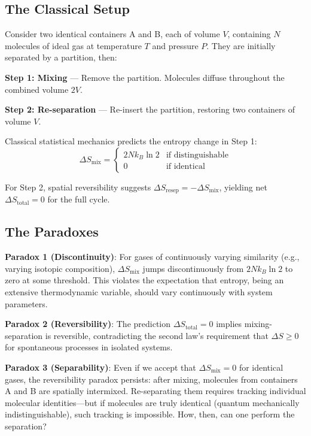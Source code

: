 \documentclass[twocolumn,superscriptaddress,prb,10pt]{revtex4-2}
\theoremstyle{definition}
\theoremstyle{remark}
\begin{document}
\subsection{The Classical Setup}

Consider two identical containers A and B, each of volume $V$, containing $N$ molecules of ideal gas at temperature $T$ and pressure $P$. They are initially separated by a partition, then:

\textbf{Step 1: Mixing} — Remove the partition. Molecules diffuse throughout the combined volume $2V$.

\textbf{Step 2: Re-separation} — Re-insert the partition, restoring two containers of volume $V$.

Classical statistical mechanics predicts the entropy change in Step 1:
\begin{equation}
\Delta S_{\text{mix}} =
\begin{cases}
2Nk_B \ln 2 & \text{if distinguishable} \\
0 & \text{if identical}
\end{cases}
\label{eq:classical_mixing}
\end{equation}

For Step 2, spatial reversibility suggests $\Delta S_{\text{resep}} = -\Delta S_{\text{mix}}$, yielding net $\Delta S_{\text{total}} = 0$ for the full cycle.

\subsection{The Paradoxes}

\textbf{Paradox 1 (Discontinuity)}: For gases of continuously varying similarity (e.g., varying isotopic composition), $\Delta S_{\text{mix}}$ jumps discontinuously from $2Nk_B \ln 2$ to zero at some threshold. This violates the expectation that entropy, being an extensive thermodynamic variable, should vary continuously with system parameters.

\textbf{Paradox 2 (Reversibility)}: The prediction $\Delta S_{\text{total}} = 0$ implies mixing-separation is reversible, contradicting the second law's requirement that $\Delta S \geq 0$ for spontaneous processes in isolated systems.

\textbf{Paradox 3 (Separability)}: Even if we accept that $\Delta S_{\text{mix}} = 0$ for identical gases, the reversibility paradox persists: after mixing, molecules from containers A and B are spatially intermixed. Re-separating them requires tracking individual molecular identities—but if molecules are truly identical (quantum mechanically indistinguishable), such tracking is impossible. How, then, can one perform the separation?
\end{document}
